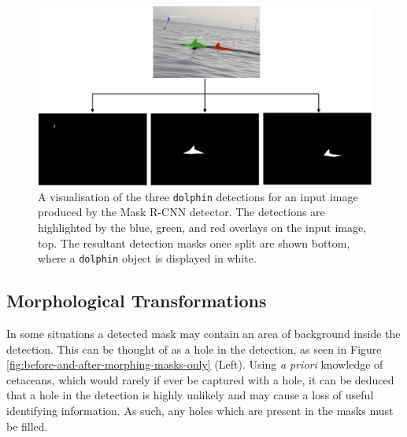 \begin{figure}
	\begin{center}
		\includegraphics[scale=0.45]{Chapter3/figs/190730-001-MOLS0360_-detections.png}
	\end{center}
	\caption[A visualisation of the three \texttt{dolphin} detections for an input image produced by the Mask R-CNN detector.]{A visualisation of the three \texttt{dolphin} detections for an input image produced by the Mask R-CNN detector. The detections are highlighted by the blue, green, and red overlays on the input image, top. The resultant detection masks once split are shown bottom, where a \texttt{dolphin} object is displayed in white.}
	\label{fig:190730-001-MOLS0360_-detections}
\end{figure}


\subsection{Morphological Transformations}\label{ch:cetDet,sec:postProcessing,sub:morphologicalTransformations}

In some situations a detected mask may contain an area of background inside the detection. This can be thought of as a hole in the detection, as seen in Figure \ref{fig:before-and-after-morphing-masks-only} (Left). Using \textit{a priori} knowledge of cetaceans, which would rarely if ever be captured with a hole, it can be deduced that a hole in the detection is highly unlikely and may cause a loss of useful identifying information. As such, any holes which are present in the masks must be filled.  

